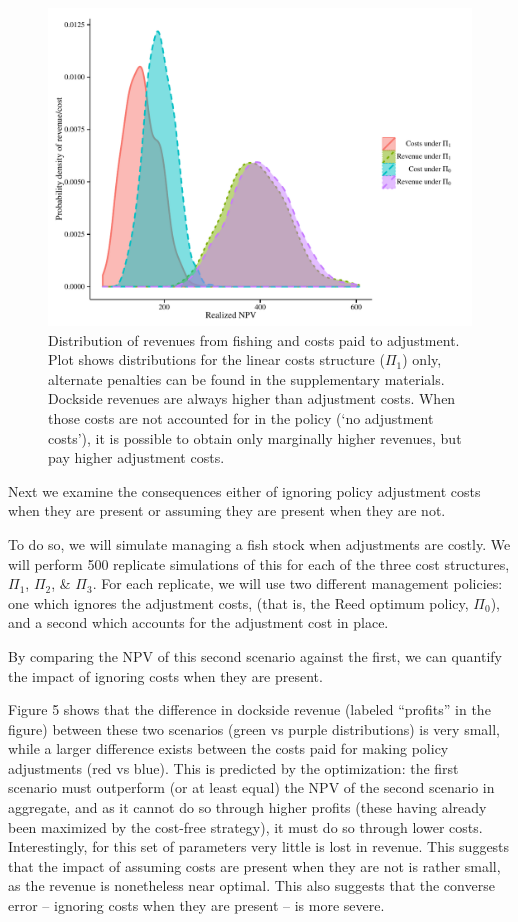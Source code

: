 \documentclass[review,12pt,author-year,titlepage]{components/elsarticle} %
\makeatletter
\def\maxwidth{\ifdim\Gin@nat@width>\linewidth\linewidth
\else\Gin@nat@width\fi}
\let\Oldincludegraphics\includegraphics
\renewcommand{\includegraphics}[1]{\Oldincludegraphics[width=\maxwidth]{#1}}
\makeatother
\begin{document}
\begin{flushleft}
\begin{figure}[htbp]
\centering
\includegraphics{components/figure/manuscript-Figure_5-1.pdf}
\caption{Distribution of revenues from fishing and costs paid to
adjustment. Plot shows distributions for the linear costs structure
(\(\Pi_1\)) only, alternate penalties can be found in the supplementary
materials. Dockside revenues are always higher than adjustment costs.
When those costs are not accounted for in the policy (`no adjustment
costs'), it is possible to obtain only marginally higher revenues, but
pay higher adjustment costs.}
\end{figure}

Next we examine the consequences either of ignoring policy adjustment
costs when they are present or assuming they are present when they are
not.

To do so, we will simulate managing a fish stock when adjustments are
costly. We will perform 500 replicate simulations of this for each of
the three cost structures, \(\Pi_1\), \(\Pi_2\), \& \(\Pi_3\). For each
replicate, we will use two different management policies: one which
ignores the adjustment costs, (that is, the Reed optimum policy,
\(\Pi_0\)), and a second which accounts for the adjustment cost in
place.

By comparing the NPV of this second scenario against the first, we can
quantify the impact of ignoring costs when they are present.

Figure 5 shows that the difference in dockside revenue (labeled
``profits'' in the figure) between these two scenarios (green vs purple
distributions) is very small, while a larger difference exists between
the costs paid for making policy adjustments (red vs blue). This is
predicted by the optimization: the first scenario must outperform (or at
least equal) the NPV of the second scenario in aggregate, and as it
cannot do so through higher profits (these having already been maximized
by the cost-free strategy), it must do so through lower costs.
Interestingly, for this set of parameters very little is lost in
revenue. This suggests that the impact of assuming costs are present
when they are not is rather small, as the revenue is nonetheless near
optimal. This also suggests that the converse error -- ignoring costs
when they are present -- is more severe.


\end{flushleft}
\end{document}

